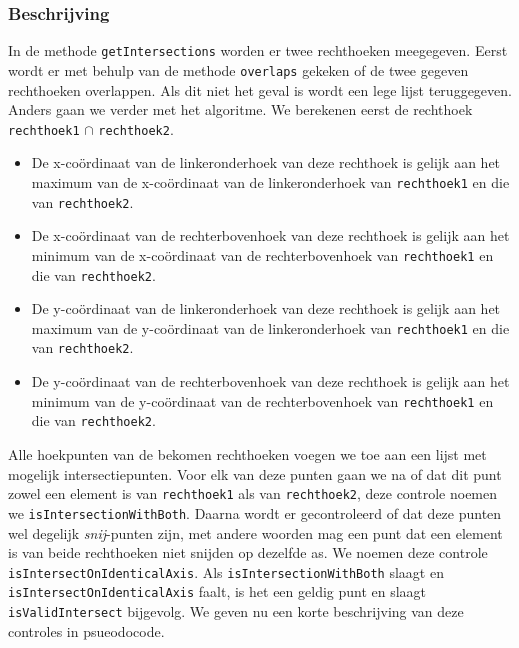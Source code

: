 \documentclass{article}
\begin{document}
\subsubsection{Beschrijving}
In de methode \texttt{getIntersections} worden er twee rechthoeken meegegeven. Eerst wordt er met behulp van de methode \texttt{overlaps} gekeken of de twee gegeven rechthoeken overlappen. Als dit niet het geval is wordt een lege lijst teruggegeven. 
Anders gaan we verder met het algoritme. We berekenen eerst de rechthoek \texttt{rechthoek1} $\cap$ \texttt{rechthoek2}. 
\begin{itemize}
\item De x-co\"ordinaat van de linkeronderhoek van deze rechthoek is gelijk aan het maximum van de x-co\"ordinaat van de linkeronderhoek van \texttt{rechthoek1} en die van \texttt{rechthoek2}. 
\item De x-co\"ordinaat van de rechterbovenhoek van deze rechthoek is gelijk aan het minimum van de x-co\"ordinaat van de rechterbovenhoek van \texttt{rechthoek1} en die van \texttt{rechthoek2}.
\item De y-co\"ordinaat van de linkeronderhoek van deze rechthoek is gelijk aan het maximum van de y-co\"ordinaat van de linkeronderhoek van \texttt{rechthoek1} en die van \texttt{rechthoek2}.
\item De y-co\"ordinaat van de rechterbovenhoek van deze rechthoek is gelijk aan het minimum van de y-co\"ordinaat van de rechterbovenhoek van \texttt{rechthoek1} en die van \texttt{rechthoek2}.
\end{itemize}

Alle hoekpunten van de bekomen rechthoeken voegen we toe aan een lijst met mogelijk intersectiepunten. Voor elk van deze punten gaan we na of dat dit punt zowel een element is van \texttt{rechthoek1} als van \texttt{rechthoek2}, deze controle noemen we \texttt{isIntersectionWithBoth}. Daarna wordt er gecontroleerd of dat deze punten wel degelijk \emph{snij}-punten zijn, met andere woorden mag een punt dat een element is van beide rechthoeken niet snijden op dezelfde as. We noemen deze controle \texttt{isIntersectOnIdenticalAxis}. Als \texttt{isIntersectionWithBoth} slaagt en \texttt{isIntersectOnIdenticalAxis} faalt, is het een geldig punt en slaagt \texttt{isValidIntersect} bijgevolg. We geven nu een korte beschrijving van deze controles in psueodocode.
\end{document}
